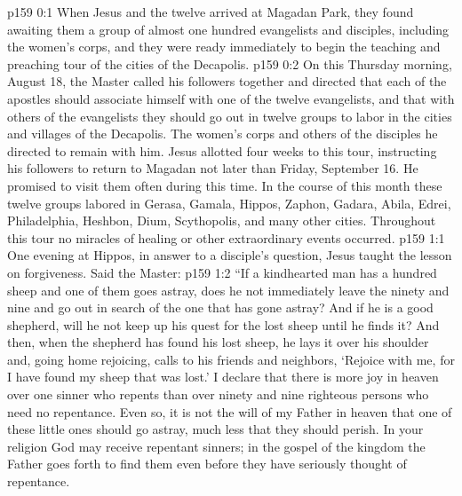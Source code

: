 \author{Midwayer Commission}
\vs p159 0:1 When Jesus and the twelve arrived at Magadan Park, they found awaiting them a group of almost one hundred evangelists and disciples, including the women’s corps, and they were ready immediately to begin the teaching and preaching tour of the cities of the Decapolis.
\vs p159 0:2 On this Thursday morning, August 18, the Master called his followers together and directed that each of the apostles should associate himself with one of the twelve evangelists, and that with others of the evangelists they should go out in twelve groups to labor in the cities and villages of the Decapolis. The women’s corps and others of the disciples he directed to remain with him. Jesus allotted four weeks to this tour, instructing his followers to return to Magadan not later than Friday, September 16. He promised to visit them often during this time. In the course of this month these twelve groups labored in Gerasa, Gamala, Hippos, Zaphon, Gadara, Abila, Edrei, Philadelphia, Heshbon, Dium, Scythopolis, and many other cities. Throughout this tour no miracles of healing or other extraordinary events occurred.
\vs p159 1:1 One evening at Hippos, in answer to a disciple’s question, Jesus taught the lesson on forgiveness. Said the Master:
\pc \vs p159 1:2 \textcolor{ubdarkred}{“If a kindhearted man has a hundred sheep and one of them goes astray, does he not immediately leave the ninety and nine and go out in search of the one that has gone astray? And if he is a good shepherd, will he not keep up his quest for the lost sheep until he finds it? And then, when the shepherd has found his lost sheep, he lays it over his shoulder and, going home rejoicing, calls to his friends and neighbors, ‘Rejoice with me, for I have found my sheep that was lost.’ I declare that there is more joy in heaven over one sinner who repents than over ninety and nine righteous persons who need no repentance. Even so, it is not the will of my Father in heaven that one of these little ones should go astray, much less that they should perish. In your religion God may receive repentant sinners; in the gospel of the kingdom the Father goes forth to find them even before they have seriously thought of repentance.}
